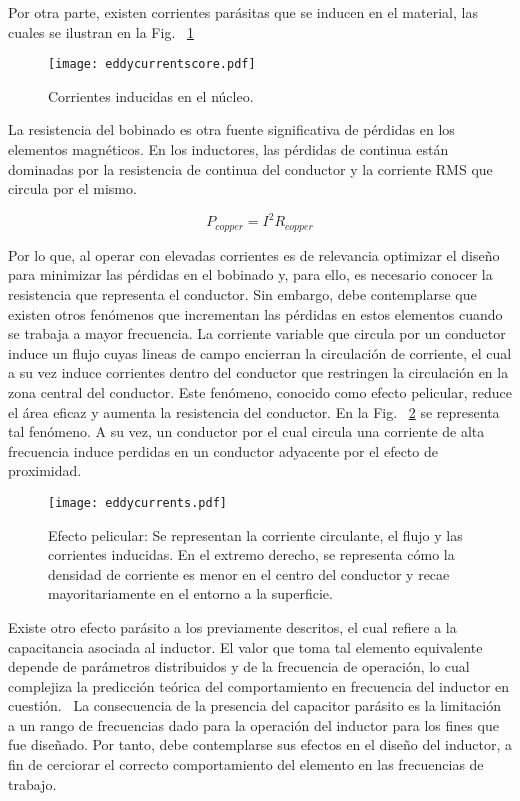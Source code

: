 Por otra parte, existen corrientes parásitas que se inducen en el material, las cuales se ilustran en la Fig. ~\ref{fig:eddycurrentscore}

\begin{figure}[H]
	\centering
	\texttt{[image: eddycurrentscore.pdf]}
	\caption{Corrientes inducidas en el núcleo.}
	\label{fig:eddycurrentscore}
\end{figure}

%
La resistencia del bobinado es otra fuente significativa de pérdidas en los elementos magnéticos. En los inductores, las pérdidas de continua están dominadas por la resistencia de continua del conductor y la corriente RMS que circula por el mismo.

\begin{equation}\label{eq:perdidasCopper}
P_{copper} = I^{2}R_{copper} 
\end{equation}

Por lo que, al operar con elevadas corrientes es de relevancia optimizar el diseño para minimizar las pérdidas en el bobinado y, para ello, es necesario conocer la resistencia que representa el conductor.
Sin embargo, debe contemplarse que existen otros fenómenos que incrementan las pérdidas en estos elementos cuando se trabaja a mayor frecuencia. La corriente variable que circula por un conductor induce un flujo cuyas lineas de campo  encierran la circulación de corriente, el cual a su vez induce corrientes dentro del conductor que restringen la circulación en la zona central del conductor. Este fenómeno, conocido como efecto pelicular, reduce el área eficaz y aumenta la resistencia del conductor. En la Fig. ~\ref{fig:eddycurrents} se representa tal fenómeno. A su vez, un conductor por el cual circula una corriente de alta frecuencia induce perdidas en un conductor adyacente por el efecto de proximidad.~\citep{cita:Erickson2001}


\begin{figure}[H]
	\centering
	\texttt{[image: eddycurrents.pdf]}
	\caption{Efecto pelicular: Se representan la corriente circulante, el flujo y las corrientes inducidas. En el extremo derecho, se representa cómo la densidad de corriente es menor en el centro del conductor y recae mayoritariamente en el entorno a la superficie.}
	\label{fig:eddycurrents}
\end{figure}


Existe otro efecto parásito a los previamente descritos, el cual refiere a la capacitancia asociada al inductor. El valor que toma tal elemento equivalente depende de parámetros distribuidos y de la frecuencia de operación, lo cual complejiza la predicción teórica del comportamiento en frecuencia del inductor en cuestión.~\citep{cita:Knight2010} La consecuencia de la presencia del capacitor parásito es la limitación a un rango de frecuencias dado para la operación del inductor para los fines que fue diseñado. Por tanto, debe contemplarse sus efectos en el diseño del inductor, a fin de cerciorar el correcto comportamiento del elemento en las frecuencias de trabajo. ~\citep{cita:Dalessandro2007}~\citep{cita:Massarini1996}





